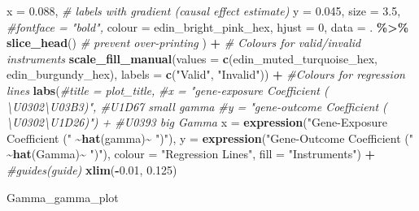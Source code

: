 \documentclass[
]{article}
\newenvironment{Shaded}{\begin{snugshade}}{\end{snugshade}}
\newcommand{\AttributeTok}[1]{\textcolor[rgb]{0.13,0.29,0.53}{#1}}
\newcommand{\CommentTok}[1]{\textcolor[rgb]{0.56,0.35,0.01}{\textit{#1}}}
\newcommand{\DecValTok}[1]{\textcolor[rgb]{0.00,0.00,0.81}{#1}}
\newcommand{\FloatTok}[1]{\textcolor[rgb]{0.00,0.00,0.81}{#1}}
\newcommand{\FunctionTok}[1]{\textcolor[rgb]{0.13,0.29,0.53}{\textbf{#1}}}
\newcommand{\NormalTok}[1]{#1}
\newcommand{\SpecialCharTok}[1]{\textcolor[rgb]{0.81,0.36,0.00}{\textbf{#1}}}
\newcommand{\StringTok}[1]{\textcolor[rgb]{0.31,0.60,0.02}{#1}}
\begin{document}
\begin{Shaded}
\begin{Highlighting}[]
            \AttributeTok{x =} \FloatTok{0.088}\NormalTok{, }\CommentTok{\# labels with gradient (causal effect estimate)}
            \AttributeTok{y =} \FloatTok{0.045}\NormalTok{,}
            \AttributeTok{size =} \FloatTok{3.5}\NormalTok{, }
            \CommentTok{\#fontface = "bold",}
            \AttributeTok{colour =}\NormalTok{ edin\_bright\_pink\_hex, }
            \AttributeTok{hjust =} \DecValTok{0}\NormalTok{, }
            \AttributeTok{data =}\NormalTok{ . }\SpecialCharTok{\%\textgreater{}\%} \FunctionTok{slice\_head}\NormalTok{() }\CommentTok{\# prevent over{-}printing}
\NormalTok{  ) }\SpecialCharTok{+}
  \CommentTok{\# Colours for valid/invalid instruments}
  \FunctionTok{scale\_fill\_manual}\NormalTok{(}\AttributeTok{values =} \FunctionTok{c}\NormalTok{(edin\_muted\_turquoise\_hex, edin\_burgundy\_hex),}
                   \AttributeTok{labels =} \FunctionTok{c}\NormalTok{(}\StringTok{"Valid"}\NormalTok{, }\StringTok{"Invalid"}\NormalTok{)) }\SpecialCharTok{+}
  \CommentTok{\#Colours for regression lines}
  \FunctionTok{labs}\NormalTok{(}\CommentTok{\#title = plot\_title,}
    \CommentTok{\#x = "gene{-}exposure Coefficient ( \textbackslash{}U0302\textbackslash{}U03B3)",  \#U1D67 small gamma}
    \CommentTok{\#y = "gene{-}outcome Coefficient ( \textbackslash{}U0302\textbackslash{}U1D26)") + \#U0393 big Gamma}
    \AttributeTok{x =} \FunctionTok{expression}\NormalTok{(}\StringTok{"Gene{-}Exposure Coefficient ("} \SpecialCharTok{\textasciitilde{}}\FunctionTok{hat}\NormalTok{(gamma)}\SpecialCharTok{\textasciitilde{}} \StringTok{")"}\NormalTok{),  }
    \AttributeTok{y =} \FunctionTok{expression}\NormalTok{(}\StringTok{"Gene{-}Outcome Coefficient ("} \SpecialCharTok{\textasciitilde{}}\FunctionTok{hat}\NormalTok{(Gamma)}\SpecialCharTok{\textasciitilde{}} \StringTok{")"}\NormalTok{),}
    \AttributeTok{colour =} \StringTok{"Regression Lines"}\NormalTok{,}
    \AttributeTok{fill =} \StringTok{"Instruments"}\NormalTok{) }\SpecialCharTok{+}
  \CommentTok{\#guides(guide)}
  \FunctionTok{xlim}\NormalTok{(}\SpecialCharTok{{-}}\FloatTok{0.01}\NormalTok{, }\FloatTok{0.125}\NormalTok{)}
  
\NormalTok{Gamma\_gamma\_plot}
\end{Highlighting}
\end{Shaded}
\end{document}
